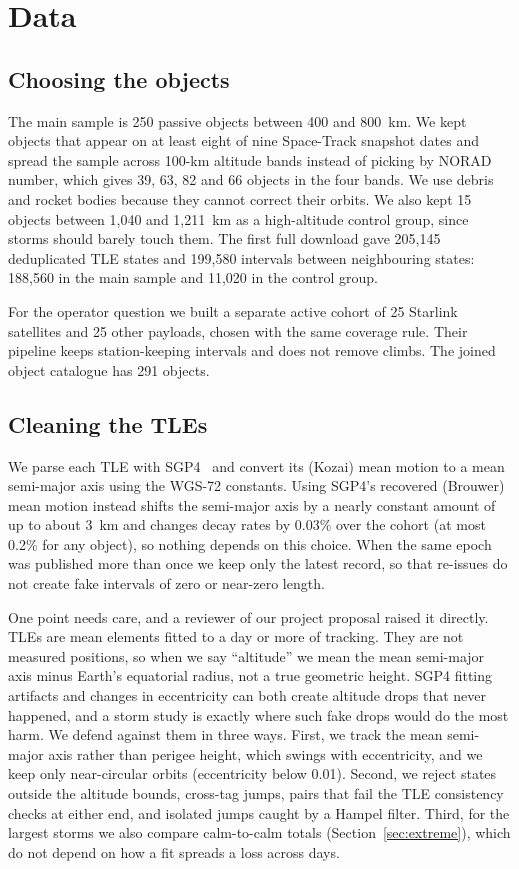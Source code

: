 \section{Data}
\label{sec:data}

\subsection{Choosing the objects}
\label{sec:cohort}

The main sample is 250 passive objects between 400 and 800~km. We kept objects that appear on at
least eight of nine Space-Track snapshot dates and spread the sample across 100-km altitude bands
instead of picking by NORAD number, which gives 39, 63, 82 and 66 objects in the four bands. We
use debris and rocket bodies because they cannot correct their orbits. We also kept 15 objects
between 1,040 and 1,211~km as a high-altitude control group, since storms should barely touch
them. The first full download gave 205,145 deduplicated TLE states and 199,580 intervals between
neighbouring states: 188,560 in the main sample and 11,020 in the control group.

For the operator question we built a separate active cohort of 25 Starlink satellites and 25
other payloads, chosen with the same coverage rule. Their pipeline keeps station-keeping
intervals and does not remove climbs. The joined object catalogue has 291 objects.

\subsection{Cleaning the TLEs}
\label{sec:cleaning}

We parse each TLE with SGP4~\cite{vallado2006sgp4} and convert its (Kozai) mean motion to a mean
semi-major axis using the WGS-72 constants. Using SGP4's recovered (Brouwer) mean motion instead
shifts the semi-major axis by a nearly constant amount of up to about 3~km and changes decay
rates by 0.03\% over the cohort (at most 0.2\% for any object), so nothing depends on this choice. When the same epoch was published
more than once we keep only the latest record, so that re-issues do not create fake intervals of
zero or near-zero length.

One point needs care, and a reviewer of our project proposal raised it directly. TLEs are mean
elements fitted to a day or more of tracking. They are not measured positions, so when we say
``altitude'' we mean the mean semi-major axis minus Earth's equatorial radius, not a true
geometric height. SGP4 fitting artifacts and changes in eccentricity can both create altitude
drops that never happened, and a storm study is exactly where such fake drops would do the most
harm. We defend against them in three ways. First, we track the mean semi-major axis rather than
perigee height, which swings with eccentricity, and we keep only near-circular orbits
(eccentricity below 0.01). Second, we reject states outside the altitude bounds, cross-tag
jumps, pairs that fail the TLE consistency checks at either end, and isolated jumps caught by a
Hampel filter. Third, for the largest storms we also compare calm-to-calm totals
(Section~\ref{sec:extreme}), which do not depend on how a fit spreads a loss across days.

